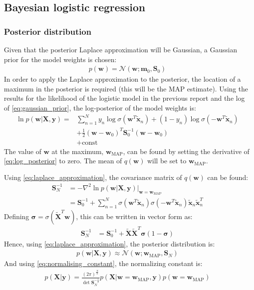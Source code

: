 \documentclass[a4paper]{article}
\begin{document}
    \subsection{Bayesian logistic regression}
    \subsubsection{Posterior distribution}
    Given that the posterior Laplace approximation will be Gaussian, a Gaussian prior for the model weights is chosen:
    \begin{align}
        p(\bm{w}) = \mathcal{N}(\bm{w}; \bm{m}_0, \bm{S}_0)
        \label{eq:gaussian_prior}
    \end{align}
    In order to apply the Laplace approximation to the posterior, the location of a maximum in the posterior is required
    (this will be the MAP estimate).
    Using the results for the likelihood of the logistic model in the previous report and the log of \autoref{eq:gaussian_prior},
    the log-posterior of the model weights is:
    \begin{align}
        \ln p(\bm{w} | \bm{X}, \bm{y}) =
        & \sum_{n=1}^{N} y_n \log\sigma( \bm{w}^T \tilde{\bm{x}}_n) + (1-y_n) \log\sigma(-\bm{w}^T \tilde{\bm{x}}_n) \nonumber \\
        & + \frac{1}{2} (\bm{w} - \bm{w}_0)^T \bm{S}_0^{-1} (\bm{w} - \bm{w}_0) \nonumber \\
        & + \text{const}
        \label{eq:log_posterior}
    \end{align}
    The value of $\bm{w}$ at the maximum, $\bm{w}_{\text{MAP}}$, can be found by setting the derivative of
    \autoref{eq:log_posterior} to zero.
    The mean of $q(\bm{w})$ will be set to $\bm{w}_{\text{MAP}}$.

    Using \autoref{eq:laplace_approximation}, the covariance matrix of $q(\bm{w})$ can be found:
    \begin{align}
        \bm{S}_N^{-1} &= -\nabla^2 \ln p(\bm{w} | \bm{X}, \bm{y}) \big|_{\bm{w} =\bm{w}_{\text{MAP}}} \nonumber \\
        &= \bm{S}_0^{-1}
        + \sum_{n=1}^N \sigma(\bm{w}^T \tilde{\bm{x}}_n) \sigma(-\bm{w}^T \tilde{\bm{x}}_n)\tilde{\bm{x}}_n\tilde{\bm{x}}_n^T
    \end{align}
    Defining $\bm{\sigma} = \sigma(\tilde{\bm{X}}^T \bm{w})$, this can be written in vector form as:
    \begin{align}
         \bm{S}_N^{-1} &= \bm{S}_0^{-1} + \tilde{\bm{X}}\tilde{\bm{X}}^T \bm{\sigma} (1 - \bm{\sigma})
    \end{align}
    Hence, using \autoref{eq:laplace_approximation}, the posterior distribution is:
    \begin{align}
        p(\bm{w} | \bm{X}, \bm{y}) \approx \mathcal{N}(\bm{w}; \bm{w}_\text{MAP}, \bm{S}_N)
    \end{align}
    And using \autoref{eq:normalising_constant}, the normalizing constant is:
    \begin{align}
        p(\bm{X} | \bm{y}) = \frac{(2\pi)^\frac{N}{2}}{\det \bm{S}_N^{-\frac{1}{2}}}
                            p(\bm{X} | \bm{w} = \bm{w}_\text{MAP}, \bm{y}) p(\bm{w} = \bm{w}_\text{MAP})
    \end{align}
\end{document}
